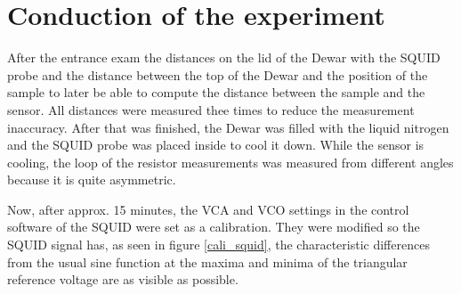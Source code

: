 \section{Conduction of the experiment}
After the entrance exam the distances on the lid of the Dewar with the SQUID probe and the distance between the top of the Dewar and the position of the sample to later be able to compute the distance between the sample and the sensor. All distances were measured thee times to reduce the measurement inaccuracy. After that was finished, the Dewar was filled with the liquid nitrogen and the SQUID probe was placed inside to cool it down. While the sensor is cooling, the loop of the resistor measurements was measured from different angles because it is quite asymmetric. \par
Now, after approx. 15 minutes, the VCA and VCO settings in the control software of the SQUID were set as a calibration. They were modified so the SQUID signal has, as seen in figure \ref{cali_squid}, the characteristic differences from the usual sine function at the maxima and minima of the triangular reference voltage are as visible as possible.

